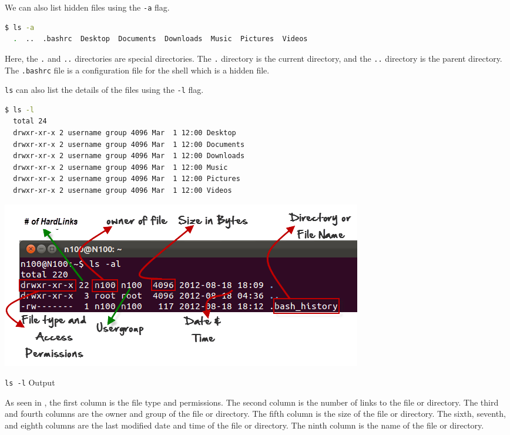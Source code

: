 We can also list hidden files
using the \texttt{-a} flag.

\begin{lstlisting}[language=bash]
  $ ls -a
  .  ..  .bashrc  Desktop  Documents  Downloads  Music  Pictures  Videos
\end{lstlisting}

Here, the \texttt{.} and \texttt{..} directories are special directories. The \texttt{.} directory is the current directory, and the \texttt{..} directory is the parent directory.
The \texttt{.bashrc} file is a configuration file for the shell which is a hidden file.

\texttt{ls} can also list the details of the files using the \texttt{-l} flag.

\begin{lstlisting}[language=bash]
  $ ls -l
  total 24
  drwxr-xr-x 2 username group 4096 Mar  1 12:00 Desktop
  drwxr-xr-x 2 username group 4096 Mar  1 12:00 Documents
  drwxr-xr-x 2 username group 4096 Mar  1 12:00 Downloads
  drwxr-xr-x 2 username group 4096 Mar  1 12:00 Music
  drwxr-xr-x 2 username group 4096 Mar  1 12:00 Pictures
  drwxr-xr-x 2 username group 4096 Mar  1 12:00 Videos
\end{lstlisting}

\begin{marginfigure}
	\includegraphics{images/png/ls-l.png}
	\caption[\texttt{ls -l} Output]{\texttt{ls -l} Output}
\end{marginfigure}

As seen in , the first column is the file type and permissions.
The second column is the number of links to the file or directory.
The third and fourth columns are the owner and group of the file or directory.
The fifth column is the size of the file or directory.
The sixth, seventh, and eighth columns are the last modified date and time of the file or directory.
The ninth column is the name of the file or directory.

